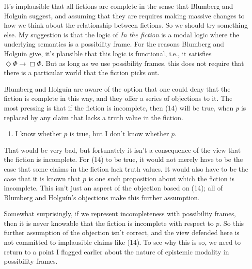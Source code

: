 \documentclass[
  11pt,
  letterpaper,
  DIV=11,
  numbers=noendperiod,
  twoside]{scrartcl}
\providecommand{\tightlist}{%
  \setlength{\itemsep}{0pt}\setlength{\parskip}{0pt}}
\begin{document}
It's implausible that all fictions are complete in the sense that
Blumberg and Holguín suggest, and assuming that they are requires making
massive changes to how we think about the relationship between fictions.
So we should try something else. My suggestion is that the logic of
\emph{In the fiction} is a modal logic where the underlying semantics is
a possibility frame. For the reasons Blumberg and Holguín give, it's
plausible that this logic is functional, i.e., it satisfies
\(\Diamond \Phi \rightarrow \Box \Phi\). But as long as we use
possibility frames, this does not require that there is a particular
world that the fiction picks out.

Blumberg and Holguín are aware of the option that one could deny that
the fiction is complete in this way, and they offer a series of
objections to it. The most pressing is that if the fiction is
incomplete, then (14) will be true, when \emph{p} is replaced by any
claim that lacks a truth value in the fiction.

\begin{enumerate}
\def\labelenumi{(\arabic{enumi})}
\setcounter{enumi}{13}
\tightlist
\item
  I know whether \(p\) is true, but I don't know whether \(p\).
\end{enumerate}

That would be very bad, but fortunately it isn't a consequence of the
view that the fiction is incomplete. For (14) to be true, it would not
merely have to be the case that some claims in the fiction lack truth
values. It would also have to be the case that it is known that \(p\) is
one such proposition about which the fiction is incomplete. This isn't
just an aspect of the objection based on (14); all of Blumberg and
Holguín's objections make this further assumption.

Somewhat surprisingly, if we represent incompleteness with possibility
frames, then it is never knowable that the fiction is incomplete with
respect to \(p\). So this further assumption of the objection isn't
correct, and the view defended here is not committed to implausible
claims like (14). To see why this is so, we need to return to a point I
flagged earlier about the nature of epistemic modality in possibility
frames.
\end{document}
